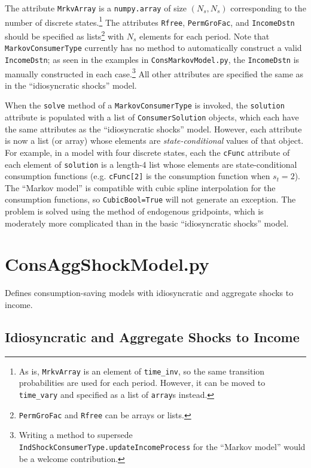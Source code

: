 \documentclass[12pt,titlepage,letterpaper]{econtex}
\begin{document}
The attribute \texttt{MrkvArray} is a \texttt{numpy.array} of size $(N_s,N_s)$ corresponding to the number of discrete states.\footnote{As is, \texttt{MrkvArray} is an element of \texttt{time\_inv}, so the same transition probabilities are used for each period.  However, it can be moved to \texttt{time\_vary} and specified as a list of \texttt{array}s instead.}  The attributes \texttt{Rfree}, \texttt{PermGroFac}, and \texttt{IncomeDstn} should be specified as lists\footnote{\texttt{PermGroFac} and \texttt{Rfree} can be arrays or lists.} with $N_s$ elements for each period.  Note that \texttt{MarkovConsumerType} currently has no method to automatically construct a valid \texttt{IncomeDstn}; as seen in the examples in \texttt{ConsMarkovModel.py}, the \texttt{IncomeDstn} is manually constructed in each case.\footnote{Writing a method to supersede  \texttt{IndShockConsumerType.updateIncomeProcess} for the ``Markov model'' would be a welcome contribution.}  All other attributes are specified the same as in the ``idiosyncratic shocks'' model.

When the \texttt{solve} method of a \texttt{MarkovConsumerType} is invoked, the \texttt{solution} attribute is populated with a list of \texttt{ConsumerSolution} objects, which each have the same attributes as the ``idiosyncratic shocks'' model.  However, each attribute is now a list (or array) whose elements are \textit{state-conditional} values of that object.  For example, in a model with four discrete states, each the \texttt{cFunc} attribute of each element of \texttt{solution} is a length-4 list whose elements are state-conditional consumption functions (e.g. \texttt{cFunc[2]} is the consumption function when $s_t=2$).  The ``Markov model'' is compatible with cubic spline interpolation for the consumption functions, so \texttt{CubicBool=True} will not generate an exception.  The problem is solved using the method of endogenous gridpoints, which is moderately more complicated than in the basic ``idiosyncratic shocks'' model.

\section{ConsAggShockModel.py}

Defines consumption-saving models with idiosyncratic and aggregate shocks to income.

\subsection{Idiosyncratic and Aggregate Shocks to Income}
\end{document}
